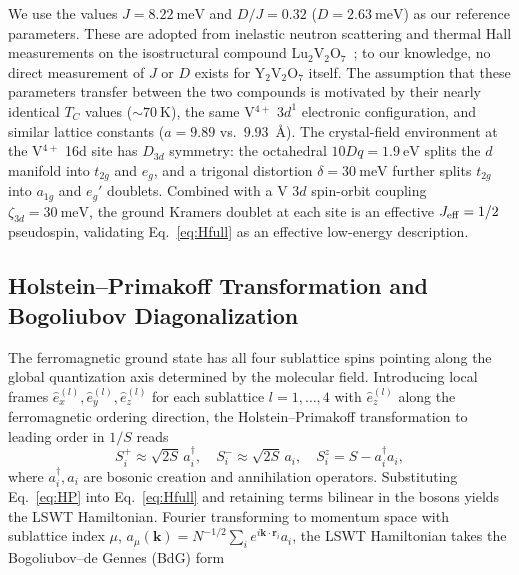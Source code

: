 \documentclass[aps,prb,twocolumn,superscriptaddress,longbibliography]{revtex4-2}
\begin{document}
We use the values $J = \SI{8.22}{\milli\eV}$ and $D/J = 0.32$
($D = \SI{2.63}{\milli\eV}$) as our reference parameters.
These are adopted from inelastic neutron scattering and thermal Hall
measurements on the isostructural compound
Lu$_2$V$_2$O$_7$~\cite{Onose2010,Ideue2012}; to our knowledge,
no direct measurement of $J$ or $D$ exists for Y$_2$V$_2$O$_7$ itself.
The assumption that these parameters transfer between the two compounds
is motivated by their nearly identical $T_C$ values ($\sim\SI{70}{\kelvin}$),
the same V$^{4+}$ $3d^1$ electronic configuration, and similar lattice
constants ($a = 9.89$ vs.\ $9.93$~\AA).
The crystal-field environment at the V$^{4+}$ 16d site has $D_{3d}$ symmetry:
the octahedral $10Dq = \SI{1.9}{\eV}$ splits the $d$ manifold into $t_{2g}$
and $e_g$, and a trigonal distortion $\delta = \SI{30}{\milli\eV}$ further
splits $t_{2g}$ into $a_{1g}$ and $e_g'$ doublets.
Combined with a V $3d$ spin-orbit coupling $\zeta_{3d} = \SI{30}{\milli\eV}$,
the ground Kramers doublet at each site is an effective $J_{\rm eff} = 1/2$
pseudospin, validating Eq.~\eqref{eq:Hfull} as an effective low-energy
description.

\subsection{Holstein--Primakoff Transformation and Bogoliubov Diagonalization}

The ferromagnetic ground state has all four sublattice spins pointing along
the global quantization axis determined by the molecular field.
Introducing local frames $\hat{e}^{(l)}_x, \hat{e}^{(l)}_y, \hat{e}^{(l)}_z$
for each sublattice $l = 1,\ldots,4$ with $\hat{e}^{(l)}_z$ along the
ferromagnetic ordering direction, the Holstein--Primakoff transformation to
leading order in $1/S$ reads
\begin{equation}
  S^+_i \approx \sqrt{2S}\, a_i^\dagger, \quad
  S^-_i \approx \sqrt{2S}\, a_i, \quad
  S^z_i = S - a_i^\dagger a_i,
  \label{eq:HP}
\end{equation}
where $a_i^\dagger, a_i$ are bosonic creation and annihilation operators.
Substituting Eq.~\eqref{eq:HP} into Eq.~\eqref{eq:Hfull} and retaining
terms bilinear in the bosons yields the LSWT Hamiltonian.
Fourier transforming to momentum space with sublattice index $\mu$,
$a_{\mu}(\bm{k}) = N^{-1/2}\sum_i e^{i\bm{k}\cdot\bm{r}_i} a_{i}$,
the LSWT Hamiltonian takes the Bogoliubov--de Gennes (BdG) form
\end{document}
